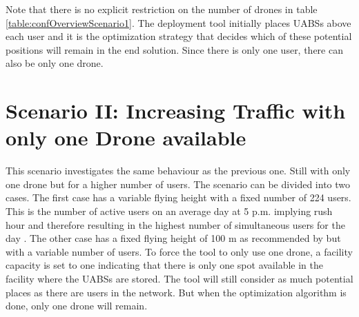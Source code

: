 Note that there is no explicit restriction on the number of drones in table \ref{table:confOverviewScenario1}. The deployment tool initially places 
\gls{UABS}s above each user and it is the optimization strategy that decides which of these potential positions will remain in the end solution.
Since there is only one user, there can also be only one drone.




\section{Scenario II: Increasing Traffic with only one Drone available}

This scenario investigates the same behaviour as the previous one. Still with only one drone but for a higher number of users. 
The scenario can be divided into two cases. The first case has a variable 
flying height with a fixed number of 224 users. This is the number of active users on an average day at 5 p.m. implying rush hour and therefore 
resulting in the highest number of simultaneous users for the day \cite{J2}. The other 
case has a fixed flying height of 100 m as recommended by \cite{J2} but with a variable number of users. To force the tool to only use one drone, a facility capacity is set to one 
indicating that there is only one spot available in the facility where the \gls{UABS}s are stored. The tool will still consider as much potential places 
as there are users in the network. But when the optimization algorithm is done, only one drone will remain.

